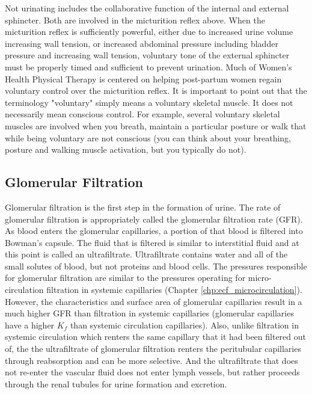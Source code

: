 Not urinating includes the collaborative function of the internal and external sphincter. Both are involved in the micturition reflex above. When the micturition reflex is sufficiently powerful, either due to increased urine volume increasing wall tension, or increased abdominal pressure including bladder pressure and increasing wall tension, voluntary tone of the external sphincter must be properly timed and sufficient to prevent urination. Much of Women's Health Physical Therapy is centered on helping post-partum women regain voluntary control over the micturition reflex. It is important to point out that the terminology "voluntary" simply means a voluntary skeletal muscle. It does not necessarily mean conscious control. For example, several voluntary skeletal muscles are involved when you breath, maintain a particular posture or walk that while being voluntary are not conscious (you can think about your breathing, posture and walking muscle activation, but you typically do not).


\subsection{Glomerular Filtration}

Glomerular filtration is the first step in the formation of urine. The rate of glomerular filtration is appropriately called the glomerular filtration rate (GFR). As blood enters the glomerular capillaries, a portion of that blood is filtered into Bowman’s capsule. The fluid that is filtered is similar to interstitial fluid and at this point is called an ultrafiltrate. Ultrafiltrate contains water and all of the small solutes of blood, but not proteins and blood cells. The pressures responsible for glomerular filtration are similar to the pressures operating for micro-circulation filtration in systemic capillaries (Chapter \ref{chp:ecf_microcirculation}). However, the characteristics and surface area of glomerular capillaries result in a much higher GFR than filtration in systemic capillaries (glomerular capillaries have a higher $K_f$ than systemic circulation capillaries). Also, unlike filtration in systemic circulation which renters the same capillary that it had been filtered out of, the the ultrafiltrate of glomerular filtration renters the peritubular capillaries through reabsorption and can be more selective. And the ultrafiltrate that does not re-enter the vascular fluid does not enter lymph vessels, but rather proceeds through the renal tubules for urine formation and excretion.

